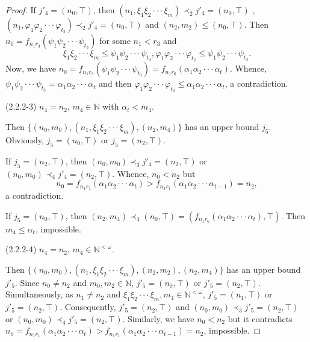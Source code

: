 \documentclass[10pt,a4paper]{amsart}
\begin{document}
\begin{proof}
If $j'_{4}=(n_{0},\top)$, then $(n_{1},\xi_{1}\xi_{2}\cdot\cdot\cdot\xi_{m})\prec_{2}j'_{4}=(n_{0},\top)$ , $(n_{1},\varphi_{1}\varphi_{2}\cdot\cdot\cdot\varphi_{t_{2}})\prec_{2}j'_{4}=(n_{0},\top)$ and $(n_{2},m_{2})\leq(n_{0},\top)$.
Then $n_{0}=f_{n_{1}r_{3}}(\psi_{1}\psi_{2}\cdot\cdot\cdot\psi_{t_{3}})$ for some $n_{1}<r_{3}$ and $$\xi_{1}\xi_{2}\cdot\cdot\cdot\xi_{m}\leq\psi_{1}\psi_{2}\cdot\cdot\cdot\psi_{t_{3}}, \varphi_{1}\varphi_{2}\cdot\cdot\cdot\varphi_{t_{2}}\leq\psi_{1}\psi_{2}\cdot\cdot\cdot\psi_{t_{3}}. $$ Now, we have $n_{0}=f_{n_{1}r_{3}}(\psi_{1}\psi_{2}\cdot\cdot\cdot\psi_{t_{3}})=f_{n_{1}r_{6}}(\alpha_{1}\alpha_{2}\cdot\cdot\cdot\alpha_{t})$. Whence, $\psi_{1}\psi_{2}\cdot\cdot\cdot\psi_{t_{3}}=\alpha_{1}\alpha_{2}\cdot\cdot\cdot\alpha_{t}$ and then $\varphi_{1}\varphi_{2}\cdot\cdot\cdot\varphi_{t_{2}}\leq\alpha_{1}\alpha_{2}\cdot\cdot\cdot\alpha_{t}$, a contradiction.

(2.2.2-3) $n_{4}=n_{2}$, $m_{4}\in\mathbb{N}$ with $\alpha_{t}<m_{4}$.

Then $\{(n_{0},m_{0}),(n_{1},\xi_{1}\xi_{2}\cdot\cdot\cdot\xi_{m}),(n_{2},m_{4})\}$ has an upper bound $j_{5}$. Obviously, $j_{5}=(n_{0},\top)$ or $j_{5}=(n_{2},\top)$.

If $j_{5}=(n_{2},\top)$, then $(n_{0},m_{0})\prec_{3}j'_{4}=(n_{2},\top)$ or $(n_{0},m_{0})\prec_{4}j'_{4}=(n_{2},\top)$. Whence, $n_{0}<n_{2}$ but $$n_{0}=f_{n_{1}r_{1}}(\alpha_{1}\alpha_{2}\cdot\cdot\cdot\alpha_{t})>f_{n_{1}r_{1}}(\alpha_{1}\alpha_{2}\cdot\cdot\cdot\alpha_{t-1})=n_{2},$$ a contradiction.

If $j_{5}=(n_{0},\top)$, then $(n_{2},m_{4})\prec_{4}(n_{0},\top)=(f_{n_{1}r_{6}}(\alpha_{1}\alpha_{2}\cdot\cdot\cdot\alpha_{t}),\top)$. Then $m_{4}\leq\alpha_{t}$, impossible.

(2.2.2-4) $n_{4}=n_{2}$, $m_{4}\in\mathbb{N}^{<\omega}$.

Then $\{(n_{0},m_{0}),(n_{1},\xi_{1}\xi_{2}\cdot\cdot\cdot\xi_{m}),(n_{2},m_{2}),(n_{2},m_{4})\}$ has an upper bound $j'_{5}$. Since $n_{0}\neq n_{2}$ and $m_{0}, m_{2}\in\mathbb{N}$, $j'_{5}=(n_{0},\top)$ or $j'_{5}=(n_{2},\top)$. Simultaneously, as  $n_{1}\neq n_{2}$ and $\xi_{1}\xi_{2}\cdot\cdot\cdot\xi_{m}, m_{4}\in\mathbb{N}^{<\omega}$, $j'_{5}=(n_{1},\top)$ or $j'_{5}=(n_{2},\top)$. Consequently, $j'_{5}=(n_{2},\top)$ and $(n_{0},m_{0})\prec_{3}j'_{5}=(n_{2},\top)$ or $(n_{0},m_{0})\prec_{4}j'_{5}=(n_{2},\top)$. Similarly, we have $n_{0}<n_{2}$ but it contradicts  $n_{0}=f_{n_{1}r_{1}}(\alpha_{1}\alpha_{2}\cdot\cdot\cdot\alpha_{t})>f_{n_{1}r_{1}}(\alpha_{1}\alpha_{2}\cdot\cdot\cdot\alpha_{t-1})=n_{2}$, impossible.


\end{proof}
\end{document}
